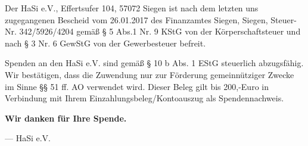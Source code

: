 \documentclass[12pt,tikz]{dinbrief}
\begin{document}
\begin{letter}{}



\subject{\textbf{Bestätigung über Zuwendungen zur Vorlage beim Finanzamt}}

\nowindowrules
\opening{}

Der HaSi e.V., Effertsufer 104, 57072 Siegen ist nach dem letzten uns zugegangenen Bescheid vom 26.01.2017 des Finanzamtes Siegen, Siegen, Steuer-Nr. 342/5926/4204 gemäß § 5 Abs.1 Nr. 9 KStG von der Körperschaftsteuer und nach § 3 Nr. 6 GewStG von der Gewerbesteuer befreit.


Spenden an den HaSi e.V. sind gemäß § 10 b Abs. 1 EStG steuerlich abzugsfähig. Wir bestätigen, dass die Zuwendung nur zur Förderung gemeinnütziger Zwecke im Sinne §§ 51 ff. AO verwendet wird. Dieser Beleg gilt bis 200,-Euro in Verbindung mit Ihrem Einzahlungsbeleg/Kontoauszug als Spendennachweis.

\textbf{Wir danken für Ihre Spende.}

--- HaSi e.V.



\end{letter}
\end{document}
